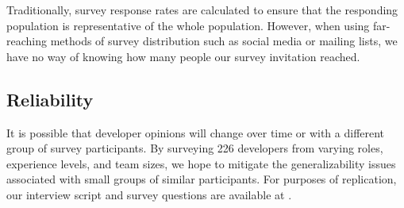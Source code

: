 Traditionally, survey response rates are calculated to ensure that the responding population is representative of the whole population. However, when using far-reaching methods of survey distribution such as social media or mailing lists, we have no way of knowing how many people our survey invitation reached.

\subsection{Reliability}
It is possible that developer opinions will change over time or with a different group of survey participants. By surveying 226 developers from varying roles, experience levels, and team sizes, we hope to mitigate the generalizability issues associated with small groups of similar participants.
For purposes of replication, our interview script and survey questions are available at \cite{companion_site}. 

